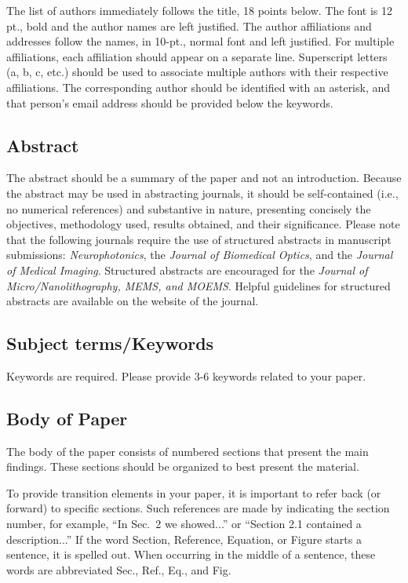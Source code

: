 \documentclass[12pt]{spieman}  %
\begin{document}
\begin{spacing}{2}
The list of authors immediately follows the title, 18 points below. The font is 12 pt., bold and the author names are left justified. The author affiliations and addresses follow the names, in 10-pt., normal font and left justified. For multiple affiliations, each affiliation should appear on a separate line. Superscript letters (a, b, c, etc.) should be used to associate multiple authors with their respective affiliations. The corresponding author should be identified with an asterisk, and that person's email address should be provided below the keywords.

\subsection{Abstract}
The abstract should be a summary of the paper and not an introduction. Because the abstract may be used in abstracting journals, it should be self-contained (i.e., no numerical references) and substantive in nature, presenting concisely the objectives, methodology used, results obtained, and their significance. Please note that the following journals require the use of structured abstracts in manuscript submissions: \textit{Neurophotonics}, the \textit{Journal of Biomedical Optics}, and the\textit{ Journal of Medical Imaging}. Structured abstracts are encouraged for the \textit{Journal of Micro/Nanolithography, MEMS, and MOEMS}. Helpful guidelines for structured abstracts are available on the website of the journal.

\subsection{Subject terms/Keywords}
Keywords are required. Please provide 3-6 keywords related to your paper.

\subsection{Body of Paper}
The body of the paper consists of numbered sections that present the main findings. These sections should be organized to best present the material.

To provide transition elements in your paper, it is important to refer back (or forward) to specific sections. Such references are made by indicating the section number, for example, ``In Sec.\ 2 we showed...'' or ``Section 2.1 contained a description...'' If the word Section, Reference, Equation, or Figure starts a sentence, it is spelled out. When occurring in the middle of a sentence, these words are abbreviated Sec., Ref., Eq., and Fig.


\end{spacing}
\end{document}
